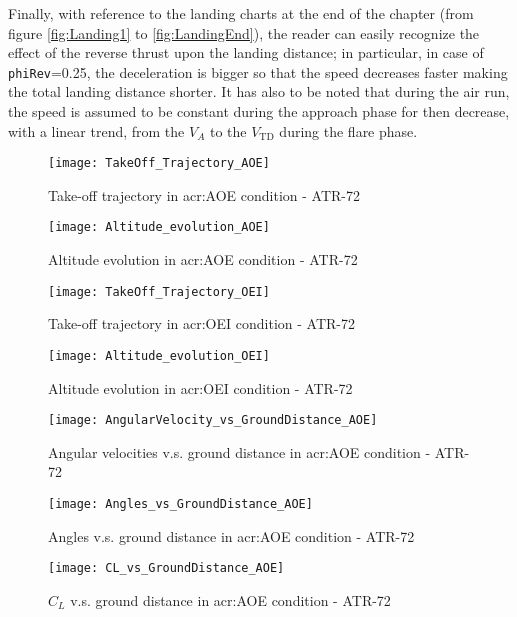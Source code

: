 \bigskip
\noindent
Finally, with reference to the landing charts at the end of the chapter (from figure \ref{fig:Landing1} to \ref{fig:LandingEnd}), the reader can easily recognize the effect of the reverse thrust upon the landing distance; in particular, in case of \lstinline[language=Java]!phiRev!=0.25, the deceleration is bigger so that the speed decreases faster making the total landing distance shorter. It has also to be noted that during the air run, the speed is assumed to be constant during the approach phase for then decrease, with a linear trend, from the $V_A$ to the $V_{\text{TD}}$ during the flare phase. 
%
\clearpage
%
%
%
\begin{figure}[H]
\centering
\texttt{[image: TakeOff\_Trajectory\_AOE]}
\caption{Take-off trajectory in \gls{acr:AOE} condition - ATR-72}
\end{figure}
%
\begin{figure}[H]
\centering
\texttt{[image: Altitude\_evolution\_AOE]}
\caption{Altitude evolution in \gls{acr:AOE} condition - ATR-72}
\end{figure}
%
\begin{figure}[H]
\centering
\texttt{[image: TakeOff\_Trajectory\_OEI]}
\caption{Take-off trajectory in \gls{acr:OEI} condition - ATR-72}
\end{figure}
%
\begin{figure}[H]
\centering
\texttt{[image: Altitude\_evolution\_OEI]}
\caption{Altitude evolution in \gls{acr:OEI} condition - ATR-72}
\end{figure}
%
\begin{figure}[H]
\centering
\texttt{[image: AngularVelocity\_vs\_GroundDistance\_AOE]}
\caption{Angular velocities v.s. ground distance in \gls{acr:AOE} condition - ATR-72}
\end{figure}
%
\begin{figure}[H]
\centering
\texttt{[image: Angles\_vs\_GroundDistance\_AOE]}
\caption{Angles v.s. ground distance in \gls{acr:AOE} condition - ATR-72}
\end{figure}
%
\begin{figure}[H]
\centering
\texttt{[image: CL\_vs\_GroundDistance\_AOE]}
\caption{$C_L$ v.s. ground distance in \gls{acr:AOE} condition - ATR-72}
\end{figure}
